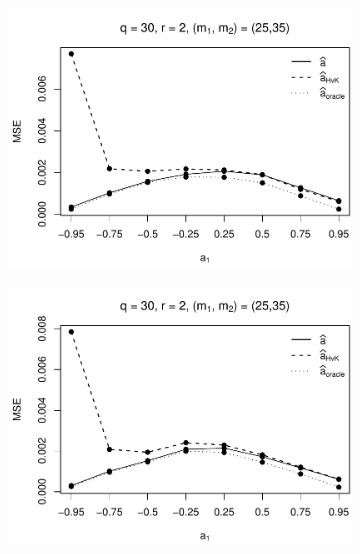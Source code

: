 \begin{figure}[p]
\begin{subfigure}[b]{0.45\textwidth}
\includegraphics[width=\textwidth]{Plots/Robustness/MSE_a1_T=500_slope=1_(q,K1,K2,M1,M2)=(30,2,10,25,35).pdf}
\end{subfigure}
\hspace{0.25cm}
\begin{subfigure}[b]{0.45\textwidth}
\includegraphics[width=\textwidth]{Plots/Robustness/MSE_a1_T=500_slope=1_(q,K1,K2,M1,M2)=(30,2,15,25,35).pdf}
\end{subfigure}


\end{figure}
